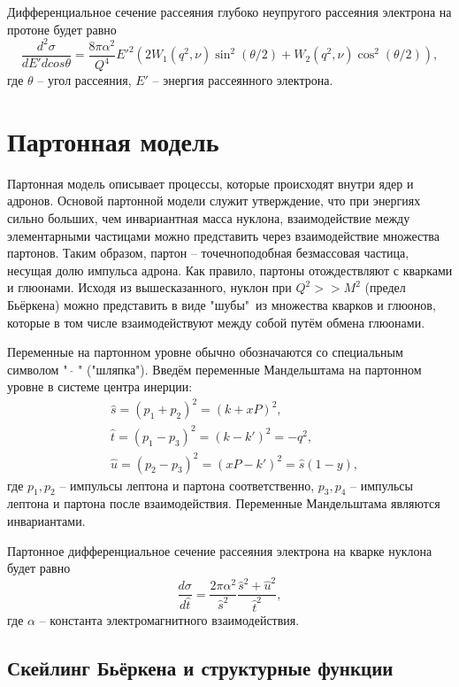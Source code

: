 \documentclass{extarticle}
\begin{document}
Дифференциальное сечение рассеяния глубоко неупругого рассеяния электрона на протоне будет равно
\begin{equation}
	\frac{d^2\sigma}{dE' d cos\theta} = \frac{8\pi \alpha^2}{Q^4} E'^2 (2W_1(q^2, \nu) \sin^2 (\theta /2) + W_2 (q^2, \nu) \cos^2 (\theta/2)),
\end{equation}
где $\theta$ -- угол рассеяния, $E'$ -- энергия рассеянного электрона.
\newpage
\section{Партонная модель}
Партонная модель описывает процессы, которые происходят внутри ядер и адронов. Основой партонной модели служит утверждение, что при энергиях сильно больших, чем инвариантная масса нуклона, взаимодействие между элементарными частицами можно представить через взаимодействие множества партонов. Таким образом, партон -- точечноподобная безмассовая частица, несущая долю импульса адрона. Как правило, партоны отождествляют с кварками и глюонами. 
Исходя из вышесказанного, нуклон при $Q^2 >> M^2$ (предел Бьёркена) можно представить в виде "шубы"\ из множества кварков и глюонов, которые в том числе взаимодействуют между собой путём обмена глюонами.


Переменные на партонном уровне обычно обозначаются со специальным символом "\ $\hat{}$ " ("шляпка"). Введём переменные Мандельштама на партонном уровне в системе центра инерции:
\begin{equation}
\begin{split}
	& \hat{s} = (p_1+p_2)^2 = (k + xP)^2, \\
	& \hat{t} = (p_1-p_3)^2 = (k-k')^2 = -q^2, \\
	& \hat{u} = (p_2-p_3)^2 =(xP-k')^2= \hat{s} (1-y),
\end{split}
\end{equation}
где $p_1, p_2$ -- импульсы лептона и партона соответственно, $p_3, p_4$ -- импульсы лептона и партона после взаимодействия. Переменные Мандельштама являются инвариантами. 

Партонное дифференциальное сечение рассеяния электрона на кварке нуклона будет равно
\begin{equation}
	\frac{d\sigma}{d\hat{t}} = \frac{2\pi \alpha^2}{\hat{s}^2} \frac{\hat{s}^2 + \hat{u}^2}{\hat{t}^2},
\end{equation}
где $\alpha$ -- константа электромагнитного взаимодействия. 

\subsection{Скейлинг Бьёркена и структурные функции}
\end{document}
